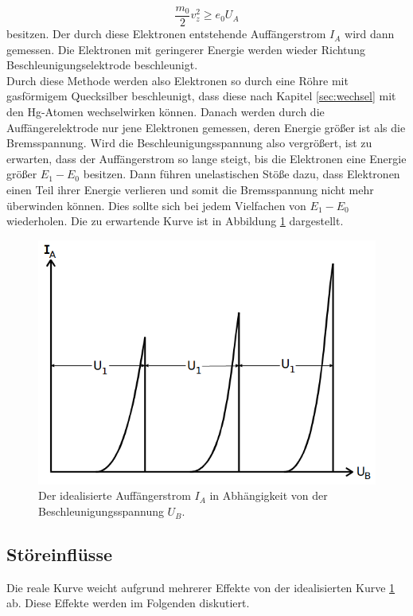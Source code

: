 \begin{equation}
    \frac{m_0}{2}v_z^2\geq e_0U_A
    \label{eqn:vz}
\end{equation}
besitzen. Der durch diese Elektronen entstehende Auffängerstrom $I_A$ wird dann gemessen. Die Elektronen mit geringerer Energie werden wieder
Richtung Beschleunigungselektrode beschleunigt.
\\\noindent
Durch diese Methode werden also Elektronen so durch eine Röhre mit gasförmigem Quecksilber beschleunigt, dass diese nach Kapitel
\ref{sec:wechsel} mit den Hg-Atomen wechselwirken können. Danach werden durch die Auffängerelektrode nur jene Elektronen gemessen, deren Energie
größer ist als die Bremsspannung. Wird die Beschleunigungsspannung also vergrößert, ist zu erwarten, dass der Auffängerstrom so lange
steigt, bis die Elektronen eine Energie größer $E_1-E_0$ besitzen. Dann führen unelastischen Stöße dazu, dass Elektronen einen Teil
ihrer Energie verlieren und somit die Bremsspannung nicht mehr überwinden können. Dies sollte sich bei jedem Vielfachen von $E_1-E_0$
wiederholen. Die zu erwartende Kurve ist in Abbildung \ref{fig:fhk1} dargestellt.
\begin{figure}[H]
    \centering
    \includegraphics[scale = 0.5]{pictures/Kurve1.png}
    \caption{Der idealisierte Auffängerstrom $I_A$ in Abhängigkeit von der Beschleunigungsspannung $U_B$. \cite{AP01}}
    \label{fig:fhk1}
\end{figure}

\subsection{Störeinflüsse}
\label{sec:stör}
Die reale Kurve weicht aufgrund mehrerer Effekte von der idealisierten Kurve \ref{fig:fhk1} ab. Diese Effekte werden im Folgenden
diskutiert.

